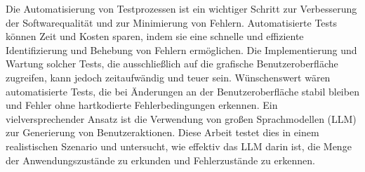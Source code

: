
\Abstract


Die Automatisierung von Testprozessen ist ein wichtiger Schritt zur Verbesserung der Softwarequalität und zur Minimierung von Fehlern.
Automatisierte Tests können Zeit und Kosten sparen, indem sie eine schnelle und effiziente Identifizierung und Behebung von Fehlern ermöglichen.
Die Implementierung und Wartung solcher Tests, die ausschließlich auf die grafische Benutzeroberfläche zugreifen, kann jedoch zeitaufwändig und teuer sein.
Wünschenswert wären automatisierte Tests, die bei Änderungen an der Benutzeroberfläche stabil bleiben und Fehler ohne hartkodierte Fehlerbedingungen erkennen.
Ein vielversprechender Ansatz ist die Verwendung von großen Sprachmodellen (LLM) zur Generierung von Benutzeraktionen.
Diese Arbeit testet dies in einem realistischen Szenario und untersucht, wie effektiv das LLM darin ist, die Menge der Anwendungszustände zu erkunden und Fehlerzustände zu erkennen.